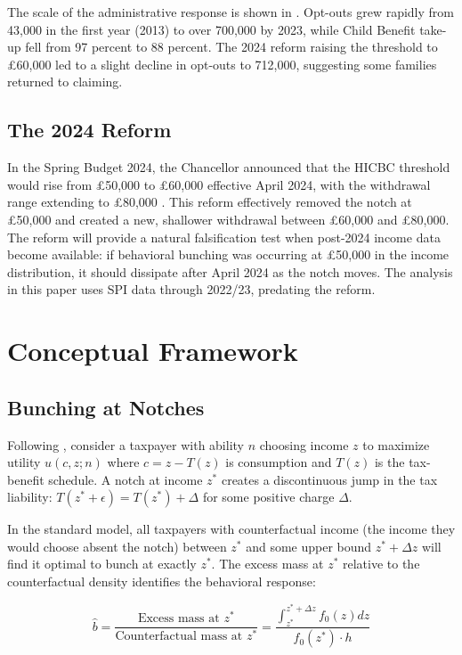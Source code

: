 \documentclass[12pt]{article}
\newcommand{\bhat}{\hat{b}}
\begin{document}
The scale of the administrative response is shown in . Opt-outs grew rapidly from 43,000 in the first year (2013) to over 700,000 by 2023, while Child Benefit take-up fell from 97 percent to 88 percent. The 2024 reform raising the threshold to \pounds60,000 led to a slight decline in opt-outs to 712,000, suggesting some families returned to claiming.

\subsection{The 2024 Reform}

In the Spring Budget 2024, the Chancellor announced that the HICBC threshold would rise from \pounds50,000 to \pounds60,000 effective April 2024, with the withdrawal range extending to \pounds80,000 \citep{obr2024}. This reform effectively removed the notch at \pounds50,000 and created a new, shallower withdrawal between \pounds60,000 and \pounds80,000. The reform will provide a natural falsification test when post-2024 income data become available: if behavioral bunching was occurring at \pounds50,000 in the income distribution, it should dissipate after April 2024 as the notch moves. The analysis in this paper uses SPI data through 2022/23, predating the reform.


\section{Conceptual Framework}

\subsection{Bunching at Notches}

Following \citet{kleven2013}, consider a taxpayer with ability $n$ choosing income $z$ to maximize utility $u(c, z; n)$ where $c = z - T(z)$ is consumption and $T(z)$ is the tax-benefit schedule. A notch at income $z^*$ creates a discontinuous jump in the tax liability: $T(z^* + \epsilon) = T(z^*) + \Delta$ for some positive charge $\Delta$.

In the standard model, all taxpayers with counterfactual income (the income they would choose absent the notch) between $z^*$ and some upper bound $z^* + \Delta z$ will find it optimal to bunch at exactly $z^*$. The excess mass at $z^*$ relative to the counterfactual density identifies the behavioral response:

\begin{equation}
    \bhat = \frac{\text{Excess mass at } z^*}{\text{Counterfactual mass at } z^*} = \frac{\int_{z^*}^{z^* + \Delta z} f_0(z) dz}{f_0(z^*) \cdot h}
    \label{eq:bunching}
\end{equation}
\end{document}
